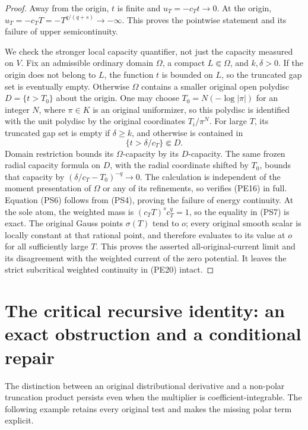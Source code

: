 \documentclass[11pt,a4paper]{article}
\numberwithin{equation}{section}
\theoremstyle{definition}
\theoremstyle{remark}
\begin{document}
\begin{proof}
Away from the origin, $t$ is finite and $u_T=-c_Tt\to0$.
At the origin, $u_T=-c_TT=-T^{q/(q+s)}\to-\infty$.
This proves the pointwise statement and its failure of upper
semicontinuity.

We check the stronger local capacity quantifier, not just the
capacity measured on $V$. Fix an admissible ordinary domain
$\Omega$, a compact $L\Subset\Omega$, and $k,\delta>0$.
If the origin does not belong to $L$, the function $t$ is bounded
on $L$, so the truncated gap set is eventually empty.
Otherwise $\Omega$ contains a smaller original open polydisc
$D=\{t>T_0\}$ about the origin. One may choose
$T_0=N(-\log|\pi|)$ for an integer $N$, where $\pi\in K$ is
an original uniformizer, so this polydisc is identified with the
unit polydisc by the original coordinates $T_i/\pi^N$.
For large $T$, its truncated
gap set is empty if $\delta\geq k$, and otherwise is contained
in
\[
                        \{t>\delta/c_T\}\Subset D.
\]
Domain restriction bounds its $\Omega$-capacity by its
$D$-capacity. The same frozen radial capacity formula on $D$,
with the radial coordinate shifted by $T_0$, bounds that capacity
by $(\delta/c_T-T_0)^{-q}\to0$.
The calculation is independent of the moment presentation of
$\Omega$ or any of its refinements, so verifies (PE16) in full.
Equation (PS6) follows from (PS4), proving the failure of energy
continuity. At the sole atom, the weighted mass is
$(c_TT)^s c_T^q=1$, so the equality in (PS7) is exact.
The original Gauss points $\sigma(T)$ tend to $o$; every original
smooth scalar is locally constant at that rational point, and
therefore evaluates to its value at $o$ for all sufficiently
large $T$. This proves the asserted all-original-current limit
and its disagreement with the weighted current of the zero
potential. It leaves the strict subcritical weighted
continuity in (PE20) intact.
\end{proof}



\section{The critical recursive identity: an exact obstruction and a conditional repair}
\label{sec:r11-critical-recursive-residue}

The distinction between an original distributional derivative and
a non-polar truncation product persists even when the multiplier
is coefficient-integrable. The following example retains every
original test and makes the missing polar term explicit.
\end{document}
